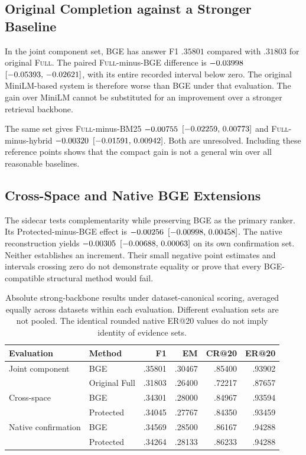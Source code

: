 \documentclass[11pt,a4paper]{article}
\newcommand{\full}{\textsc{Full}\xspace}
\begin{document}
\subsection{Original Completion against a Stronger Baseline}
In the joint component set, BGE has answer F1 $.35801$ compared with
$.31803$ for original \full. The paired \full-minus-BGE difference is
$-0.03998$ $[-0.05393,\,-0.02621]$, with its entire recorded interval below zero.
The original MiniLM-based system is therefore worse than BGE under that
evaluation. The gain over MiniLM cannot be substituted for an improvement
over a stronger retrieval backbone.

The same set gives \full-minus-BM25 $-0.00755$ $[-0.02259,\,0.00773]$ and
\full-minus-hybrid $-0.00320$ $[-0.01591,\,0.00942]$.
Both are unresolved. Including these reference points shows that the compact
gain is not a general win over all reasonable baselines.

\subsection{Cross-Space and Native BGE Extensions}
The sidecar tests complementarity while preserving BGE as the primary ranker.
Its Protected-minus-BGE effect is $-0.00256$ $[-0.00998,\,0.00458]$.
The native reconstruction yields $-0.00305$ $[-0.00688,\,0.00063]$ on its own
confirmation set. Neither establishes an increment. Their small negative
point estimates and intervals crossing zero do not demonstrate equality or
prove that every BGE-compatible structural method would fail.

\begin{table}[t]
\centering\small
\begin{tabular}{@{}llrrrr@{}}
\toprule
Evaluation & Method & F1 & EM & CR@20 & ER@20\\
\midrule
Joint component & BGE & .35801 & .30467 & .85400 & .93902\\
 & Original Full & .31803 & .26400 & .72217 & .87657\\
Cross-space & BGE & .34301 & .28000 & .84967 & .93594\\
 & Protected & .34045 & .27767 & .84350 & .93459\\
Native confirmation & BGE & .34569 & .28500 & .86167 & .94288\\
 & Protected & .34264 & .28133 & .86233 & .94288\\
\bottomrule
\end{tabular}
\caption{Absolute strong-backbone results under dataset-canonical scoring, averaged
equally across datasets within each evaluation. Different evaluation sets
are not pooled. The identical rounded native ER@20 values do not imply
identity of evidence sets.}
\label{tab:strong}
\end{table}
\end{document}
